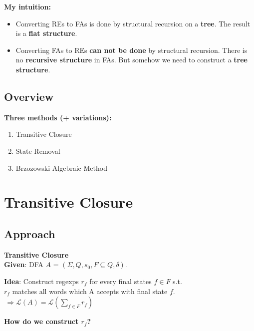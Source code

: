 \documentclass{beamer}
\begin{document}
\begin{frame}
    \textbf{My intuition:} 
    \begin{itemize}
        \item
            Converting REs to FAs is done by structural recursion on a \textbf{tree}. The result is a \textbf{flat structure}.

            \pause

        \item
            Converting FAs to REs \textbf{can not be done} by structural recursion. There is no \textbf{recursive structure} in FAs. But somehow we need to construct a \textbf{tree structure}.
    \end{itemize}



\end{frame}

\subsection*{Overview}
\begin{frame}

    \textbf{Three methods (+ variations):}

    \begin{enumerate}
        \item Transitive Closure
        \item State Removal
        \item Brzozowski Algebraic Method
    \end{enumerate}

\end{frame}

\section{Transitive Closure}
\subsection*{Approach}
\begin{frame}

    \large{\textbf{Transitive Closure}} \\

    \textbf{Given}: DFA $A$ = $(\Sigma, Q, s_0, F \subseteq Q, \delta)$.

    \textbf{Idea}: Construct regexps $r_f$ for every final states $f \in F$ s.t. \\$r_f$ matches all words which A accepts with final state $f$. \\

    $\, \Rightarrow \mathcal{L}(A) = \mathcal{L}(\sum_{f \in F} r_f)$

    \vspace{5 mm}

    \textbf{How do we construct $r_f$?} 

\end{frame}
\end{document}
